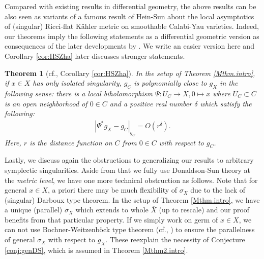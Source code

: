 \documentclass[12pt,a4paper]{amsart}
\newtheorem{Thm}{Theorem}[section]
\theoremstyle{remark}
\theoremstyle{definition}
\begin{document}
Compared with existing results in differential geometry, the above results 
can be also seen as variants of a famous 
result of Hein-Sun 
\cite{HeinSun} about the local asymptotics of 
(singular) Ricci-flat K\"ahler metric on smoothable 
Calabi-Yau varieties. Indeed, our theorems 
imply the following statements as a differential geometric 
version as consequences of the later developments by 
\cite{ChiuSzek, Zha24}. 
We write an easier version here and Corollary 
\ref{cor:HSZha} later discusses stronger statements. 

\begin{Thm}[cf., Corollary \ref{cor:HSZha}]
In the setup of Theorem \ref{Mthm.intro}, 
if $x\in X$ has only isolated singularity, $g_C$ is 
polynomially close to $g_X$ in the  following sense: 
there is a local biholomorphism 
$\Psi\colon U_C \to X, 0\mapsto x$  where 
$U_C \subset C$ is an open  neighborhood of $0\in C$ 
and a 
positive real number $\delta$ 
which satisfy the following: 
\begin{align}
|\Psi ^*g_X -g_C|_{g_C}=O(r^{\delta}).
\end{align} Here, $r$ is the 
distance function on $C$ from $0\in C$ with respect to 
$g_C$. 
\end{Thm}

Lastly, we discuss again the 
obstructions to generalizing our results to arbitrary  
symplectic singularities. 
Aside from that we fully use Donaldson-Sun theory 
at the {\it metric level}, 
we have one more technical obstruction as follows. 
Note that for general $x\in X$, a priori 
there may be much flexibility of $\sigma_X$ due to the lack of 
(singular) Darboux type theorem. 
In the setup of Theorem \ref{Mthm.intro}, 
we have a unique (parallel)  $\sigma_X$ 
which extends to whole $\overline{X}$ (up to rescale) 
and our proof benefits from that particular property. 
If we simply work on germ of $x\in X$, 
we can not use 
Bochner-Weitzenb\"ock type theorem (cf., \cite[Theorem A]{Henri.etc}) 
to ensure the 
parallelness of general $\sigma_X$ with respect to $g_X$. These reexplain the necessity of  Conjecture \ref{conj:genDS}, which is assumed 
in Theorem \ref{Mthm2.intro}. 
\end{document}
